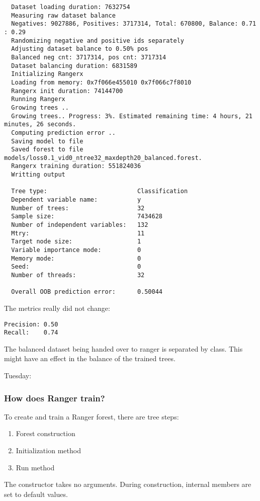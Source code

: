 \documentclass[12pt,oneside]{book}
\begin{document}
\begin{lstlisting}
  Dataset loading duration: 7632754
  Measuring raw dataset balance
  Negatives: 9027886, Positives: 3717314, Total: 670800, Balance: 0.71 : 0.29
  Randomizing negative and positive ids separately
  Adjusting dataset balance to 0.50% pos
  Balanced neg cnt: 3717314, pos cnt: 3717314
  Dataset balancing duration: 6831589
  Initializing Rangerx
  Loading from memory: 0x7f066e455010 0x7f066c7f8010
  Rangerx init duration: 74144700
  Running Rangerx
  Growing trees ..
  Growing trees.. Progress: 3%. Estimated remaining time: 4 hours, 21 minutes, 26 seconds.
  Computing prediction error ..
  Saving model to file
  Saved forest to file models/loss0.1_vid0_ntree32_maxdepth20_balanced.forest.
  Rangerx training duration: 551824036
  Writting output
  
  Tree type:                         Classification
  Dependent variable name:           y
  Number of trees:                   32
  Sample size:                       7434628
  Number of independent variables:   132
  Mtry:                              11
  Target node size:                  1
  Variable importance mode:          0
  Memory mode:                       0
  Seed:                              0
  Number of threads:                 32
  
  Overall OOB prediction error:      0.50044  
\end{lstlisting}

The metrics really did not change:
\begin{lstlisting}
Precision: 0.50
Recall:    0.74
\end{lstlisting}

The balanced dataset being handed over to ranger is separated by class.
This might have an effect in the balance of the trained trees.

Tuesday:
\subsubsection{How does Ranger train?}
To create and train a Ranger forest, there are tree steps:
\begin{enumerate}
  \item Forest construction
  \item Initialization method
  \item Run method
\end{enumerate}

The constructor takes no arguments. During construction, internal members are set to default values.
\end{document}
